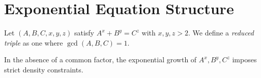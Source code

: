 
\section{Exponential Equation Structure}
\begin{definition}
Let \( (A, B, C, x, y, z) \) satisfy \( A^x + B^y = C^z \) with \( x, y, z > 2 \).
We define a \textit{reduced triple} as one where \( \gcd(A,B,C) = 1 \).
\end{definition}

\begin{lemma}
In the absence of a common factor, the exponential growth of \( A^x, B^y, C^z \) imposes strict density constraints.
\end{lemma}
